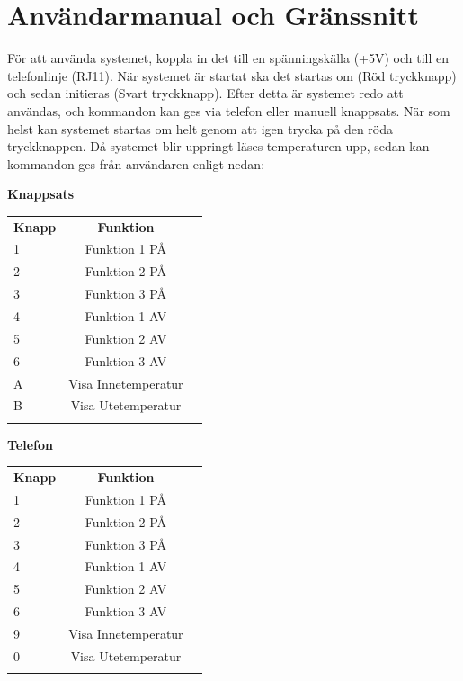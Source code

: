 \documentclass[a4paper,11pt]{article}
\begin{document}
	\appendix
	\section{Användarmanual och Gränssnitt}

	För att använda systemet, koppla in det till en spänningskälla (+5V) och till en telefonlinje (RJ11).
	När systemet är startat ska det startas om (Röd tryckknapp) och sedan initieras (Svart tryckknapp).
	Efter detta är systemet redo att användas, och kommandon kan ges via telefon eller manuell knappsats.
	När som helst kan systemet startas om helt genom att igen trycka på den röda tryckknappen.
	Då systemet blir uppringt läses temperaturen upp, sedan kan kommandon ges från användaren enligt nedan:\\

	\begin{table}[ht]
		\begin{minipage}[b]{0.5\linewidth}\centering
			{\bf Knappsats}\\
			\begin{tabular}{l c r}
				\\{\bf Knapp} & {\bf Funktion}\\
				1 & Funktion 1 PÅ\\		
				2 & Funktion 2 PÅ\\		
				3 & Funktion 3 PÅ\\
				4 & Funktion 1 AV\\	
				5 & Funktion 2 AV\\
				6 & Funktion 3 AV\\		
				A & Visa Innetemperatur\\
				B & Visa Utetemperatur \\\\
			\end{tabular}
	 	\end{minipage}
	 	\hspace{0.5cm}
	 	\begin{minipage}[b]{0.5\linewidth}
			\centering
			{\bf Telefon}\\
			\begin{tabular}{l c r}
				\\{\bf Knapp} & {\bf Funktion}\\
				1 & Funktion 1 PÅ\\		
				2 & Funktion 2 PÅ\\		
				3 & Funktion 3 PÅ\\
				4 & Funktion 1 AV\\	
				5 & Funktion 2 AV\\
				6 & Funktion 3 AV\\
				9 & Visa Innetemperatur\\
				0 & Visa Utetemperatur \\\\
			\end{tabular}
	 	\end{minipage}
	\end{table}
\end{document}
